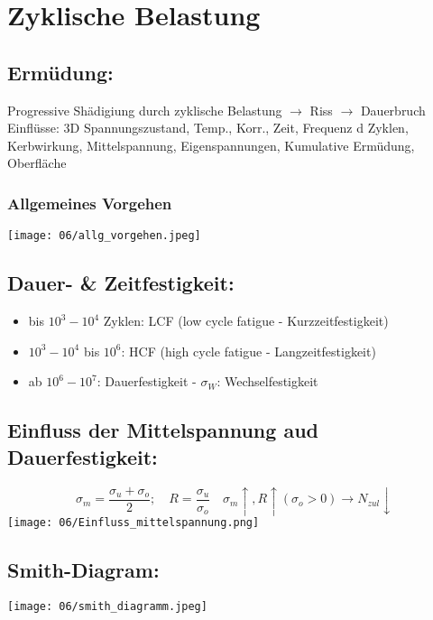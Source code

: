 \section{Zyklische Belastung}
    \subsection{Ermüdung:}
        Progressive Shädigiung durch zyklische Belastung $\rightarrow$ Riss $\rightarrow$ Dauerbruch\\
        Einflüsse: 3D Spannungszustand, Temp., Korr., Zeit, Frequenz d Zyklen, Kerbwirkung, Mittelspannung, Eigenspannungen, Kumulative Ermüdung, Oberfläche
        \subsubsection{Allgemeines Vorgehen}
            \texttt{[image: 06/allg\_vorgehen.jpeg]}
        \subsection{Dauer- \& Zeitfestigkeit:}
            \begin{minipage}{\linewidth}
                \begin{itemize}
                    \item bis $10^3-10^4$ Zyklen: LCF (low cycle fatigue - Kurzzeitfestigkeit)
                    \item $10^3-10^4$ bis $10^6$: HCF (high cycle fatigue - Langzeitfestigkeit)
                    \item ab $10^6-10^7$: Dauerfestigkeit - $\sigma_W$: Wechselfestigkeit
                \end{itemize}
            \end{minipage}
    \subsection{Einfluss der Mittelspannung aud Dauerfestigkeit:}
        \[\sigma_m=\frac{\sigma_u+\sigma_o}{2}; \quad R=\frac{\sigma_u}{\sigma_o} \quad \sigma_m \uparrow, R \uparrow (\sigma_o >0) \rightarrow N_{zul} \downarrow\]
        \texttt{[image: 06/Einfluss\_mittelspannung.png]}
    \subsection{Smith-Diagram:}
        \texttt{[image: 06/smith\_diagramm.jpeg]}
    
    